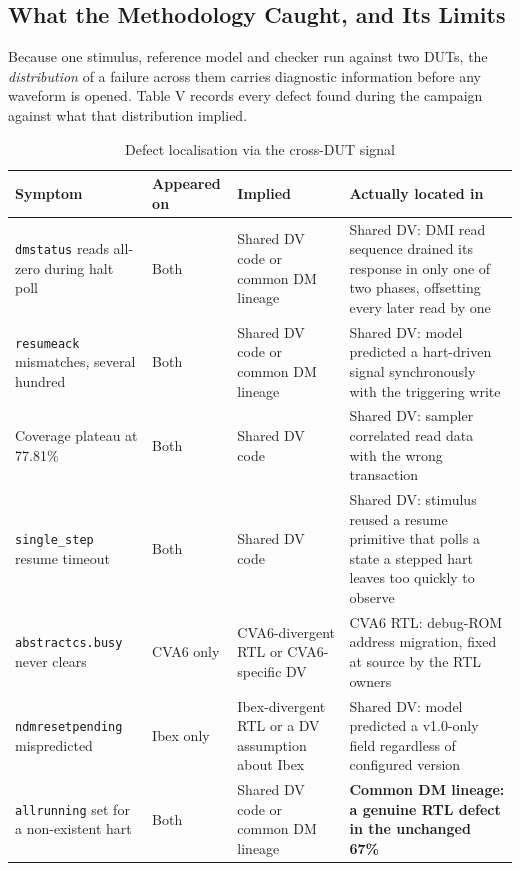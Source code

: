 \documentclass[conference]{IEEEtran}
\begin{document}
\subsection{What the Methodology Caught, and Its Limits}
Because one stimulus, reference model and checker run against two DUTs, the \textit{distribution} of a failure across them carries diagnostic information before any waveform is opened. Table V records every defect found during the campaign against what that distribution implied.

\begin{table}[!t]
\caption{Defect localisation via the cross-DUT signal}
\label{tab:V}
\centering
\footnotesize
\begin{tabular}{p{}p{}p{}p{}}
\toprule
Symptom & Appeared on & Implied & Actually located in \\
\midrule
\texttt{dmstatus} reads all-zero during halt poll & Both & Shared DV code or common DM lineage & Shared DV: DMI read sequence drained its response in only one of two phases, offsetting every later read by one \\
\texttt{resumeack} mismatches, several hundred & Both & Shared DV code or common DM lineage & Shared DV: model predicted a hart-driven signal synchronously with the triggering write \\
Coverage plateau at 77.81\% & Both & Shared DV code & Shared DV: sampler correlated read data with the wrong transaction \\
\texttt{single\_step} resume timeout & Both & Shared DV code & Shared DV: stimulus reused a resume primitive that polls a state a stepped hart leaves too quickly to observe \\
\texttt{abstractcs.busy} never clears & CVA6 only & CVA6-divergent RTL or CVA6-specific DV & CVA6 RTL: debug-ROM address migration, fixed at source by the RTL owners \\
\texttt{ndmresetpending} mispredicted & Ibex only & Ibex-divergent RTL or a DV assumption about Ibex & Shared DV: model predicted a v1.0-only field regardless of configured version \\
\texttt{allrunning} set for a non-existent hart & Both & Shared DV code or common DM lineage & \textbf{Common DM lineage: a genuine RTL defect in the unchanged 67\%} \\
\bottomrule
\end{tabular}
\end{table}
\end{document}
